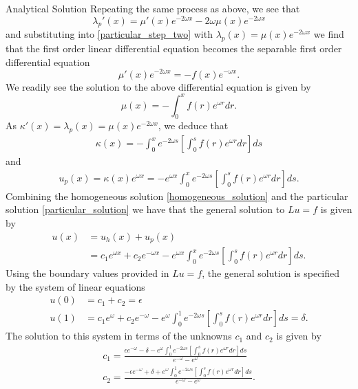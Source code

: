 \documentclass{article}
\begin{document}
\begin{section}{Analytical Solution}
  Repeating the same process as above, we see that
  \[
    \lambda_p'(x) = \mu'(x) e^{-2 \omega x} - 2 \omega\mu(x) e^{-2 \omega x}
  \]
  and substituting into \eqref{particular_step_two} with $\lambda_p(x) = \mu(x) e^{-2\omega x}$
  we find that the first order linear differential equation becomes the separable first order differential
  equation
  \[
    \mu'(x)e^{-2 \omega x} = -f(x)e^{-\omega x}.
  \]
  We readily see the solution to the above differential equation is given by
  \[
    \mu(x) = - \int_{0}^x f(r) e^{\omega r} dr.
  \]
  As $\kappa'(x) = \lambda_p(x) = \mu(x)e^{-2\omega x}$, we deduce that
  \begin{align}\label{kappa}
    \kappa(x) = - \int_{0}^{x} e^{-2 \omega s} \left[ \int_{0}^s f(r) e^{\omega r} dr \right] ds
  \end{align}
  and
  \begin{align}\label{particular_solution}
    u_p(x) = \kappa(x)e^{\omega x} = -e^{\omega x} \int_{0}^{x} e^{-2 \omega s} \left[ \int_{0}^s f(r) e^{\omega r} dr \right] ds.
  \end{align}
  Combining the homogeneous solution \eqref{homogeneous_solution} and the particular
  solution \eqref{particular_solution} we have that the general solution to
  $Lu = f$ is given by
  \begin{align}\label{general_analytical_solution}
    u(x) &= u_h(x) + u_p(x) \nonumber \\
    &= c_1 e^{\omega x} + c_2 e^{-\omega x} - e^{\omega x} \int_{0}^{x} e^{-2 \omega s} \left[ \int_{0}^s f(r) e^{\omega r} dr \right] ds.
  \end{align}
  Using the boundary values provided in $Lu=f$, the general solution is specified
  by the system of linear equations
  \begin{align*}
    u(0) &= c_1 + c_2 = \epsilon \\
    u(1) &= c_1 e^{\omega} + c_2 e^{-\omega} - e^{\omega} \int_{0}^{1} e^{-2 \omega s} \left[ \int_{0}^s f(r) e^{\omega r} dr \right] ds = \delta .
  \end{align*}
  The solution to this system in terms of the unknowns $c_1$ and $c_2$ is given
  by
  \begin{align*}
    c_1 = \frac{\epsilon e^{-\omega} - \delta - e^{\omega} \int_{0}^{1} e^{-2 \omega s} \left[ \int_{0}^s f(r) e^{\omega r} dr \right] ds}{e^{-\omega} - e^{\omega}}\\
    c_2 = \frac{-\epsilon e^{-\omega} + \delta + e^{\omega} \int_{0}^{1} e^{-2 \omega s} \left[ \int_{0}^s f(r) e^{\omega r} dr \right] ds}{e^{-\omega} - e^{\omega}}.
  \end{align*}


\end{section}
\end{document}
